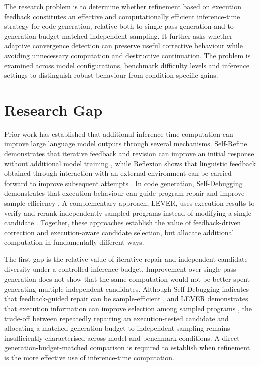 The research problem is to determine whether refinement based on execution feedback constitutes an effective and computationally efficient inference-time strategy for code generation, relative both to single-pass generation and to generation-budget-matched independent sampling. It further asks whether adaptive convergence detection can preserve useful corrective behaviour while avoiding unnecessary computation and destructive continuation. The problem is examined across model configurations, benchmark difficulty levels and inference settings to distinguish robust behaviour from condition-specific gains.

\section{Research Gap}

Prior work has established that additional inference-time computation can improve large language model outputs through several mechanisms. Self-Refine demonstrates that iterative feedback and revision can improve an initial response without additional model training \citep{madaan2023selfrefine}, while Reflexion shows that linguistic feedback obtained through interaction with an external environment can be carried forward to improve subsequent attempts \citep{shinn2023reflexion}. In code generation, Self-Debugging demonstrates that execution behaviour can guide program repair and improve sample efficiency \citep{chen2023selfdebug}. A complementary approach, LEVER, uses execution results to verify and rerank independently sampled programs instead of modifying a single candidate \citep{ni2023lever}. Together, these approaches establish the value of feedback-driven correction and execution-aware candidate selection, but allocate additional computation in fundamentally different ways.

The first gap is the relative value of iterative repair and independent candidate diversity under a controlled inference budget. Improvement over single-pass generation does not show that the same computation would not be better spent generating multiple independent candidates. Although Self-Debugging indicates that feedback-guided repair can be sample-efficient \citep{chen2023selfdebug}, and LEVER demonstrates that execution information can improve selection among sampled programs \citep{ni2023lever}, the trade-off between repeatedly repairing an execution-tested candidate and allocating a matched generation budget to independent sampling remains insufficiently characterised across model and benchmark conditions. A direct generation-budget-matched comparison is required to establish when refinement is the more effective use of inference-time computation.

